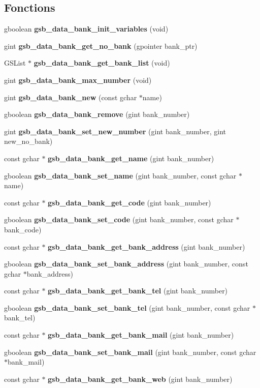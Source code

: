 \subsection*{Fonctions}
\begin{DoxyCompactItemize}
\item 
gboolean {\bf gsb\_\-data\_\-bank\_\-init\_\-variables} (void)
\item 
gint {\bf gsb\_\-data\_\-bank\_\-get\_\-no\_\-bank} (gpointer bank\_\-ptr)
\item 
GSList $\ast$ {\bf gsb\_\-data\_\-bank\_\-get\_\-bank\_\-list} (void)
\item 
gint {\bf gsb\_\-data\_\-bank\_\-max\_\-number} (void)
\item 
gint {\bf gsb\_\-data\_\-bank\_\-new} (const gchar $\ast$name)
\item 
gboolean {\bf gsb\_\-data\_\-bank\_\-remove} (gint bank\_\-number)
\item 
gint {\bf gsb\_\-data\_\-bank\_\-set\_\-new\_\-number} (gint bank\_\-number, gint new\_\-no\_\-bank)
\item 
const gchar $\ast$ {\bf gsb\_\-data\_\-bank\_\-get\_\-name} (gint bank\_\-number)
\item 
gboolean {\bf gsb\_\-data\_\-bank\_\-set\_\-name} (gint bank\_\-number, const gchar $\ast$name)
\item 
const gchar $\ast$ {\bf gsb\_\-data\_\-bank\_\-get\_\-code} (gint bank\_\-number)
\item 
gboolean {\bf gsb\_\-data\_\-bank\_\-set\_\-code} (gint bank\_\-number, const gchar $\ast$bank\_\-code)
\item 
const gchar $\ast$ {\bf gsb\_\-data\_\-bank\_\-get\_\-bank\_\-address} (gint bank\_\-number)
\item 
gboolean {\bf gsb\_\-data\_\-bank\_\-set\_\-bank\_\-address} (gint bank\_\-number, const gchar $\ast$bank\_\-address)
\item 
const gchar $\ast$ {\bf gsb\_\-data\_\-bank\_\-get\_\-bank\_\-tel} (gint bank\_\-number)
\item 
gboolean {\bf gsb\_\-data\_\-bank\_\-set\_\-bank\_\-tel} (gint bank\_\-number, const gchar $\ast$bank\_\-tel)
\item 
const gchar $\ast$ {\bf gsb\_\-data\_\-bank\_\-get\_\-bank\_\-mail} (gint bank\_\-number)
\item 
gboolean {\bf gsb\_\-data\_\-bank\_\-set\_\-bank\_\-mail} (gint bank\_\-number, const gchar $\ast$bank\_\-mail)
\item 
const gchar $\ast$ {\bf gsb\_\-data\_\-bank\_\-get\_\-bank\_\-web} (gint bank\_\-number)

\end{DoxyCompactItemize}
